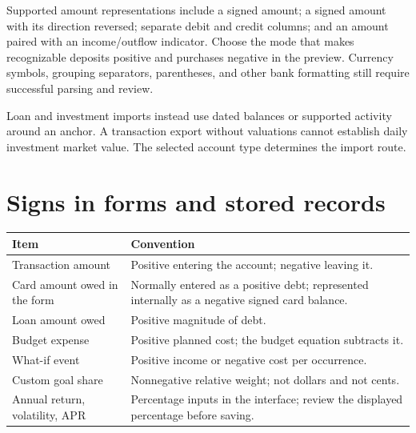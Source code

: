 Supported amount representations include a signed amount; a signed amount with its direction reversed; separate debit and credit columns; and an amount paired with an income/outflow indicator. Choose the mode that makes recognizable deposits positive and purchases negative in the preview. Currency symbols, grouping separators, parentheses, and other bank formatting still require successful parsing and review.

Loan and investment imports instead use dated balances or supported activity around an anchor. A transaction export without valuations cannot establish daily investment market value. The selected account type determines the import route.

\section{Signs in forms and stored records}
\begin{tabularx}{\textwidth}{@{}p{}Y@{}}
\toprule Item & Convention\\\midrule
Transaction amount & Positive entering the account; negative leaving it.\\
Card amount owed in the form & Normally entered as a positive debt; represented internally as a negative signed card balance.\\
Loan amount owed & Positive magnitude of debt.\\
Budget expense & Positive planned cost; the budget equation subtracts it.\\
What-if event & Positive income or negative cost per occurrence.\\
Custom goal share & Nonnegative relative weight; not dollars and not cents.\\
Annual return, volatility, APR & Percentage inputs in the interface; review the displayed percentage before saving.\\
\bottomrule
\end{tabularx}

